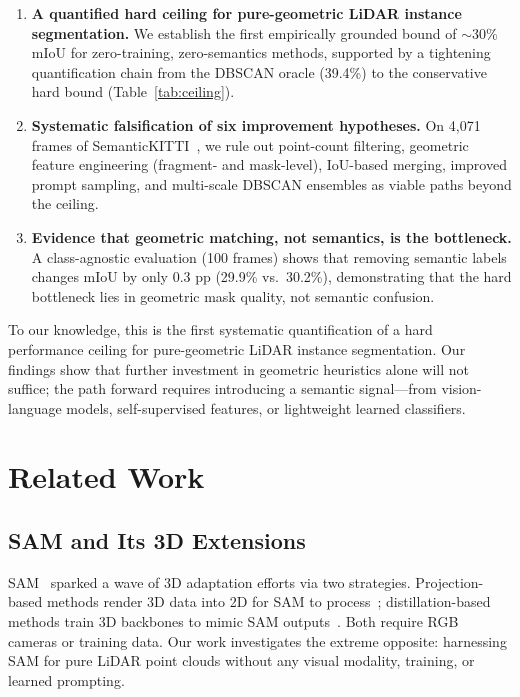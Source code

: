 \documentclass{article}
\begin{document}
\begin{enumerate}
    \item \textbf{A quantified hard ceiling for pure-geometric LiDAR instance
    segmentation.} We establish the first empirically grounded bound of
    $\sim$30\% mIoU for zero-training, zero-semantics methods, supported by a
    tightening quantification chain from the DBSCAN oracle (39.4\%) to the
    conservative hard bound (Table~\ref{tab:ceiling}).

    \item \textbf{Systematic falsification of six improvement hypotheses.} On
    4,071 frames of SemanticKITTI~\cite{Behley_2019_ICCV}, we rule out
    point-count filtering, geometric feature engineering (fragment- and
    mask-level), IoU-based merging, improved prompt sampling, and multi-scale
    DBSCAN ensembles as viable paths beyond the ceiling.

    \item \textbf{Evidence that geometric matching, not semantics, is the
    bottleneck.} A class-agnostic evaluation (100 frames) shows that removing
    semantic labels changes mIoU by only 0.3 pp (29.9\% vs.\ 30.2\%),
    demonstrating that the hard bottleneck lies in geometric mask quality, not
    semantic confusion.
\end{enumerate}

To our knowledge, this is the first systematic quantification of a hard
performance ceiling for pure-geometric LiDAR instance segmentation. Our findings
show that further investment in geometric heuristics alone will not suffice; the
path forward requires introducing a semantic signal---from vision-language models,
self-supervised features, or lightweight learned classifiers.

\section{Related Work}

\subsection{SAM and Its 3D Extensions}

SAM~\cite{Kirillov_2023_ICCV} sparked a wave of 3D adaptation efforts via two
strategies. Projection-based methods render 3D data into 2D for SAM to
process~\cite{guo2024sam2point,cen2023segment}; distillation-based methods train
3D backbones to mimic SAM outputs~\cite{zhou2024pointsam}. Both require RGB
cameras or training data. Our work investigates the extreme opposite: harnessing
SAM for pure LiDAR point clouds without any visual modality, training, or learned
prompting.
\end{document}
